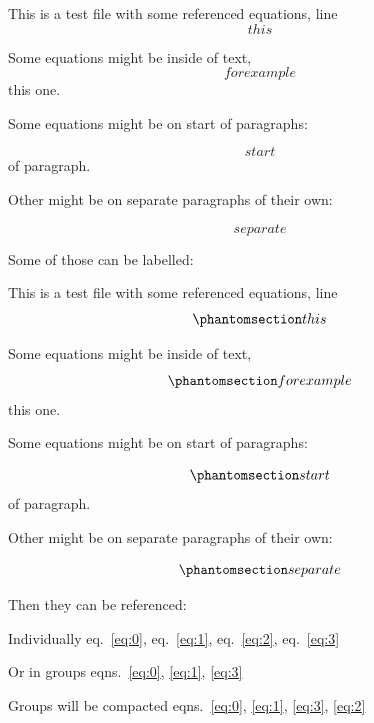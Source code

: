 This is a test file with some referenced equations, line
\begin{equation}{this}\end{equation}

Some equations might be inside of text,
\begin{equation}{for example}\end{equation} this one.

Some equations might be on start of paragraphs:

\begin{equation}{start}\end{equation} of paragraph.

Other might be on separate paragraphs of their own:

\begin{equation}{separate}\end{equation}

Some of those can be labelled:

This is a test file with some referenced equations, line
\begin{equation}\protect\phantomsection\label{eq:0}{this}\end{equation}

Some equations might be inside of text,
\begin{equation}\protect\phantomsection\label{eq:1}{for example}\end{equation}
this one.

Some equations might be on start of paragraphs:

\begin{equation}\protect\phantomsection\label{eq:2}{start}\end{equation}
of paragraph.

Other might be on separate paragraphs of their own:

\begin{equation}\protect\phantomsection\label{eq:3}{separate}\end{equation}

Then they can be referenced:

Individually eq.~\ref{eq:0}, eq.~\ref{eq:1}, eq.~\ref{eq:2},
eq.~\ref{eq:3}

Or in groups eqns.~\ref{eq:0}, \ref{eq:1}, \ref{eq:3}

Groups will be compacted
eqns.~\ref{eq:0}, \ref{eq:1}, \ref{eq:3}, \ref{eq:2}
